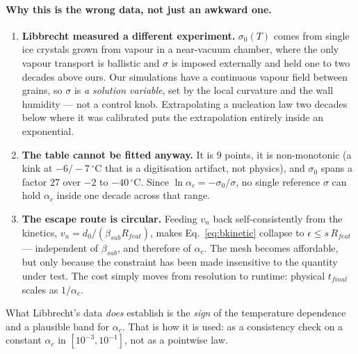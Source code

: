 \paragraph{Why this is the wrong data, not just an awkward one.}
\begin{enumerate}
  \item \textbf{Libbrecht measured a different experiment.} $\sigma_0(T)$
    comes from single ice crystals grown from vapour in a near-vacuum
    chamber, where the only vapour transport is ballistic and $\sigma$ is
    imposed externally and held one to two decades above ours. Our
    simulations have a continuous vapour field between grains, so $\sigma$ is
    \emph{a solution variable}, set by the local curvature and the wall
    humidity --- not a control knob. Extrapolating a nucleation law two
    decades below where it was calibrated puts the extrapolation entirely
    inside an exponential.
  \item \textbf{The table cannot be fitted anyway.} It is $9$ points, it is
    non-monotonic (a kink at $-6/-7\,^\circ$C that is a digitisation artifact,
    not physics), and $\sigma_0$ spans a factor $27$ over $-2$ to
    $-40\,^\circ$C. Since $\ln\alpha_c = -\sigma_0/\sigma$, no single
    reference $\sigma$ can hold $\alpha_c$ inside one decade across that
    range.
  \item \textbf{The escape route is circular.} Feeding $v_n$ back
    self-consistently from the kinetics, $v_n = d_0/(\beta_{sub}R_{feat})$,
    makes Eq.~\eqref{eq:bkinetic} collapse to $\epsilon \le s\,R_{feat}$ ---
    independent of $\beta_{sub}$, and therefore of $\alpha_c$. The mesh
    becomes affordable, but only because the constraint has been made
    insensitive to the quantity under test. The cost simply moves from
    resolution to runtime: physical $t_{final}$ scales as $1/\alpha_c$.
\end{enumerate}
%
What Libbrecht's data \emph{does} establish is the \emph{sign} of the
temperature dependence and a plausible band for $\alpha_c$. That is how it is
used: as a consistency check on a constant $\alpha_c$ in
$[10^{-3},10^{-1}]$, not as a pointwise law.
